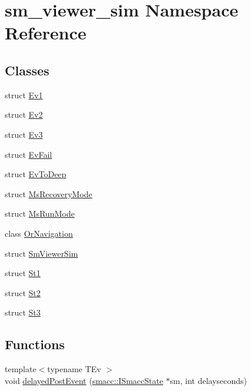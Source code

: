 \hypertarget{namespacesm__viewer__sim}{}\section{sm\+\_\+viewer\+\_\+sim Namespace Reference}
\label{namespacesm__viewer__sim}
\subsection*{Classes}
\begin{DoxyCompactItemize}
\item 
struct \hyperlink{structsm__viewer__sim_1_1Ev1}{Ev1}
\item 
struct \hyperlink{structsm__viewer__sim_1_1Ev2}{Ev2}
\item 
struct \hyperlink{structsm__viewer__sim_1_1Ev3}{Ev3}
\item 
struct \hyperlink{structsm__viewer__sim_1_1EvFail}{Ev\+Fail}
\item 
struct \hyperlink{structsm__viewer__sim_1_1EvToDeep}{Ev\+To\+Deep}
\item 
struct \hyperlink{structsm__viewer__sim_1_1MsRecoveryMode}{Ms\+Recovery\+Mode}
\item 
struct \hyperlink{structsm__viewer__sim_1_1MsRunMode}{Ms\+Run\+Mode}
\item 
class \hyperlink{classsm__viewer__sim_1_1OrNavigation}{Or\+Navigation}
\item 
struct \hyperlink{structsm__viewer__sim_1_1SmViewerSim}{Sm\+Viewer\+Sim}
\item 
struct \hyperlink{structsm__viewer__sim_1_1St1}{St1}
\item 
struct \hyperlink{structsm__viewer__sim_1_1St2}{St2}
\item 
struct \hyperlink{structsm__viewer__sim_1_1St3}{St3}
\end{DoxyCompactItemize}
\subsection*{Functions}
\begin{DoxyCompactItemize}
\item 
{\footnotesize template$<$typename T\+Ev $>$ }\\void \hyperlink{namespacesm__viewer__sim_a19b5db17983d5b9bbf21e96ecf9ab5c8}{delayed\+Post\+Event} (\hyperlink{classsmacc_1_1ISmaccState}{smacc\+::\+I\+Smacc\+State} $\ast$sm, int delayseconds)
\end{DoxyCompactItemize}


